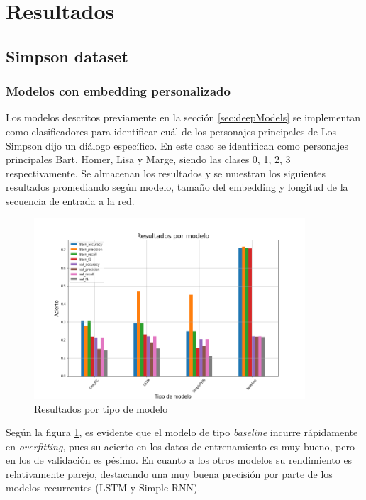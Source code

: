 \section{Resultados}

\subsection{Simpson dataset}

\subsubsection{Modelos con embedding personalizado}

Los modelos descritos previamente en la sección \ref{sec:deepModels} se implementan como clasificadores para identificar cuál de los personajes principales de Los Simpson dijo un diálogo específico. En este caso se identifican como personajes principales Bart, Homer, Lisa y Marge, siendo las clases 0, 1, 2, 3 respectivamente. Se almacenan los resultados y se muestran los siguientes resultados promediando según modelo, tamaño del embedding y longitud de la secuencia de entrada a la red.\\

\begin{figure}
    \centering
    \includegraphics[width=0.9\textwidth]{results/friends/deepModels/sim_res_deep_model.png}
    \caption{Resultados por tipo de modelo}
    \label{fig:sim_deep_model}
\end{figure}

Según la figura \ref{fig:sim_deep_model}, es evidente que el modelo de tipo \textit{baseline} incurre rápidamente en \textit{overfitting}, pues su acierto en los datos de entrenamiento es muy bueno, pero en los de validación es pésimo. En cuanto a los otros modelos su rendimiento es relativamente parejo, destacando una muy buena precisión por parte de los modelos recurrentes  (LSTM y Simple RNN).\\

